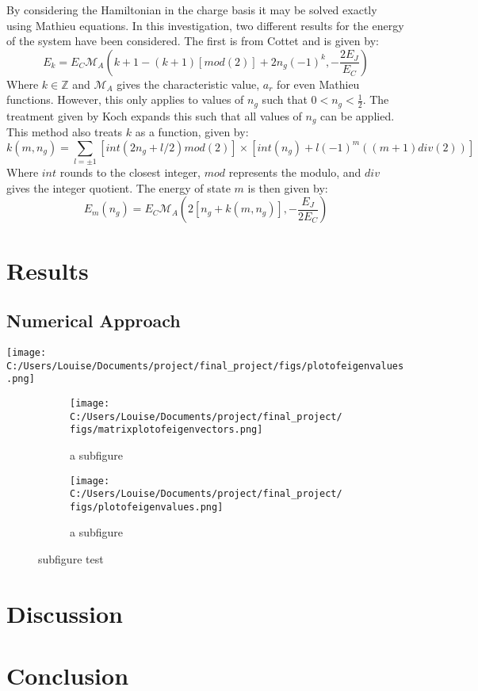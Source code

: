 \documentclass[11pt]{article}
\begin{document}
By considering the Hamiltonian in the charge basis it may be solved exactly using Mathieu equations. In this investigation, two different results for the energy of the system have been considered. The first is from Cottet and is given by:
\begin{equation}
E_k = E_C \mathcal{M}_A (k+1 - (k+1)[mod(2)] + 2n_g(-1)^k, -\frac{2E_J}{E_C})
\end{equation}
Where $k \in \mathbb{Z}$ and $\mathcal{M}_A$ gives the characteristic value, $a_r$ for even Mathieu functions. However, this only applies to values of $n_g$ such that $0 < n_g < \frac{1}{2}$. The treatment given by Koch expands this such that all values of $n_g$ can be applied. This method also treats $k$ as a function, given by:
\begin{equation}
k(m, n_g) = \sum_{l=\pm 1} [int(2n_g + l/2)mod(2)] \times [int(n_g) + l(-1)^m ((m+1)div(2))]
\end{equation}
Where $int$ rounds to the closest integer, $mod$ represents the modulo, and $div$ gives the integer quotient.  The energy of state $m$ is then given by:
\begin{equation}
E_m(n_g) = E_C \mathcal{M}_A (2[n_g + k(m,n_g)],-\frac{E_J}{2E_C})
\end{equation}

    \section{Results}
	\subsection{Numerical Approach}
	


	\texttt{[image: C:/Users/Louise/Documents/project/final\_project/figs/plotofeigenvalues.png]}
	\label{fig:graph2}

\begin{figure}
\centering
\begin{subfigure}{.5\linetwidth}
	\centering
	\texttt{[image: C:/Users/Louise/Documents/project/final\_project/figs/matrixplotofeigenvectors.png]}
	\caption{a subfigure}
	\label{fig:graph1}
\end{subfigure}%
\begin{subfigure}{\linewidth}
	\centering
	\texttt{[image: C:/Users/Louise/Documents/project/final\_project/figs/plotofeigenvalues.png]}
	\caption{a subfigure}
	\label{fig:graph2}
\end{subfigure}
\caption{subfigure test}
\label{fig:test}
\end{figure}


    \section{Discussion}

    \section{Conclusion}
\end{document}
